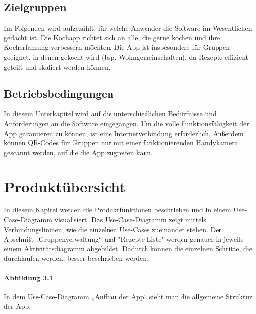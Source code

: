 \documentclass[parskip=full]{scrartcl}
\begin{document}
\subsection{Zielgruppen}
Im Folgenden wird aufgezählt, für welche Anwender die Software im Wesentlichen gedacht ist. \newline
Die Kochapp richtet sich an alle, die gerne kochen und ihre Kocherfahrung verbessern möchten.
Die App ist insbesondere für Gruppen geeignet, in denen gekocht wird (bsp. Wohngemeinschaften), da Rezepte effizient geteilt und skaliert werden können.

\subsection{Betriebsbedingungen}
In diesem Unterkapitel wird auf die unterschiedlichen Bedürfnisse und Anforderungen an die Software eingegangen. \newline
Um die volle Funktionsfähigkeit der App garantieren zu können, ist eine Internetverbindung erforderlich. Außerdem können QR-Codes für Gruppen nur mit einer funktionierenden Handykamera gescannt werden, auf die die App zugreifen kann.

\section{Produktübersicht}
In diesem Kapitel werden die Produktfunktionen beschrieben und in einem Use-Case-Diagramm visualisiert.
Das Use-Case-Diagramm zeigt mittels Verbindungslininen, wie die einzelnen Use-Cases zueinander stehen.
Der Abschnitt „Gruppenverwaltung“ und "Rezepte Liste" werden genauer in jeweils einem Aktivitätsdiagramm abgebildet.
Dadurch können die einzelnen Schritte, die durchlaufen werden, besser beschrieben werden.\par


\paragraph{Abbildung 3.1}

In dem Use-Case-Diagramm „Aufbau der App“ sieht man die allgemeine Struktur der App.
\end{document}
